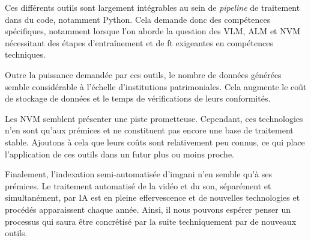 Ces différents outils sont largement intégrables au sein de \textit{pipeline} de traitement dans du code, notamment Python. Cela demande donc des compétences spécifiques, notamment lorsque l'on aborde la question des \gls{VLM}, \gls{ALM} et \gls{NVM} nécessitant des étapes d'entraînement et de \gls{ft} exigeantes en compétences techniques.

Outre la puissance demandée par ces outils, le nombre de données générées semble considérable à l'échelle d'institutions patrimoniales. Cela augmente le coût de stockage de données et le temps de vérifications de leurs conformités.

Les \gls{NVM} semblent présenter une piste prometteuse. Cependant, ces technologies n'en sont qu'aux prémices et ne constituent pas encore une base de traitement stable. Ajoutons à cela que leurs coûts sont relativement peu connus, ce qui place l'application de ces outils dans un futur plus ou moins proche.\newline

Finalement, l'indexation semi-automatisée d'\gls{imgani} n'en semble qu'à ses prémices. Le traitement automatisé de la vidéo et du son, séparément et simultanément, par \gls{IA} est en pleine effervescence et de nouvelles technologies et procédés apparaissent chaque année. Ainsi, il nous pouvons espérer penser un processus  qui saura être concrétisé par la suite techniquement par de nouveaux outils.